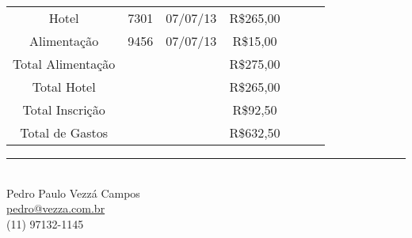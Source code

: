 \documentclass{article}
\begin{document}
\begin{table}[htbp!]
\begin{tabular}{|c|c|c|c|c|c|}
    Hotel                 & 7301   & 07/07/13 & R\$265,00            & ~                                & ~                   \\
    Alimentação           & 9456   & 07/07/13 & R\$15,00             & ~                                & ~                   \\
\hline
    Total Alimentação     & ~      & ~        & R\$275,00            & ~                                & ~                   \\
    Total Hotel           & ~      & ~        & R\$265,00            & ~                                & ~                   \\
    Total Inscrição       & ~      & ~        & R\$92,50             & ~                                & ~                   \\
\hline
    Total de Gastos       & ~      & ~        & R\$632,50            & ~                                & ~                   \\
\hline

    \end{tabular}
\end{table}

\vfill

\begin{flushright}
\noindent\rule{8cm}{0.4pt} \\
Pedro Paulo Vezzá Campos\\
\url{pedro@vezza.com.br}\\
(11) 97132-1145\\
\end{flushright}



%
%
\end{document}
